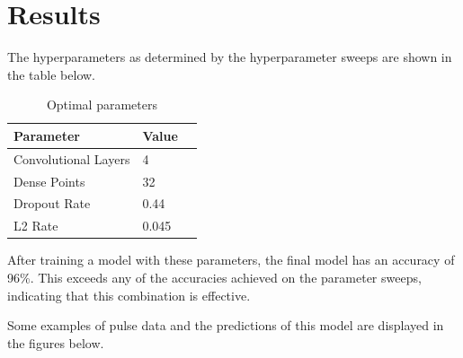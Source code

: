 \documentclass{article}
\begin{document}
\section{Results}

The hyperparameters as determined by the hyperparameter sweeps are shown in the table below. 

\begin{table}[H]
    \caption{Optimal parameters}
    \label{results}
    \centering
    \begin{tabular}{lll}
      \toprule
      Parameter     & Value  \\
      \midrule
      Convolutional Layers & 4     \\
      Dense Points     & 32     \\
      Dropout Rate     & 0.44  \\
      L2 Rate     & 0.045  \\
      \bottomrule
    \end{tabular}
  \end{table}

After training a model with these parameters, the final model has an accuracy of 96\%. This exceeds any of the accuracies achieved on the parameter sweeps, indicating that this combination is effective.

Some examples of pulse data and the predictions of this model are displayed in the figures below.
\end{document}
